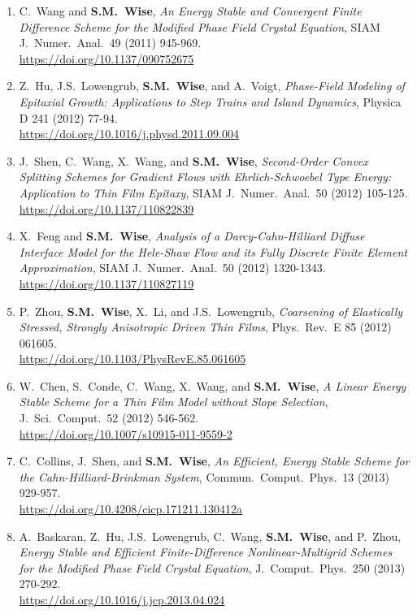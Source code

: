 \documentclass[11pt]{letter}
\begin{document}
\begin{enumerate}
	\item
C.~Wang and \textbf{S.M.~Wise}, {\sl An Energy Stable and Convergent Finite Difference Scheme for the Modified Phase Field Crystal Equation}, SIAM J.~Numer.~Anal.~49 (2011) 945-969.
	\\
\url{https://doi.org/10.1137/090752675}

	\item
Z.~Hu, J.S.~Lowengrub, \textbf{S.M.~Wise}, and A.~Voigt, {\sl Phase-Field Modeling of Epitaxial Growth: Applications to Step Trains and Island Dynamics}, Physica D 241 (2012) 77-94.
	\\
\url{https://doi.org/10.1016/j.physd.2011.09.004}

	\item
J.~Shen, C.~Wang, X.~Wang, and \textbf{S.M.~Wise}, {\sl Second-Order Convex Splitting Schemes for Gradient Flows with Ehrlich-Schwoebel Type Energy: Application to Thin Film Epitaxy}, SIAM J.~Numer.~Anal.~50 (2012) 105-125.
	\\
\url{https://doi.org/10.1137/110822839}
    
    \item
X.~Feng and \textbf{S.M.~Wise}, {\sl Analysis of a Darcy-Cahn-Hilliard Diffuse Interface Model for the Hele-Shaw Flow and its Fully Discrete Finite Element Approximation}, SIAM J.~Numer.~Anal.~50 (2012) 1320-1343.
	\\
\url{https://doi.org/10.1137/110827119}

    \item
P.~Zhou, \textbf{S.M.~Wise}, X.~Li, and J.S.~Lowengrub, {\sl Coarsening of Elastically Stressed, Strongly Anisotropic Driven Thin Films}, Phys.~Rev.~E 85 (2012) 061605.
	\\
\url{https://doi.org/10.1103/PhysRevE.85.061605}

	\item
W.~Chen, S.~Conde, C.~Wang, X.~Wang, and \textbf{S.M.~Wise}, {\sl A Linear Energy Stable Scheme for a Thin Film Model without Slope Selection}, J.~Sci.~Comput.~52 (2012) 546-562.
	\\
\url{https://doi.org/10.1007/s10915-011-9559-2}

    \item
C.~Collins, J.~Shen, and \textbf{S.M.~Wise}, {\sl An Efficient, Energy Stable Scheme for the Cahn-Hilliard-Brinkman System}, Commun.~Comput.~Phys.~13 (2013) 929-957.
	\\
\url{https://doi.org/10.4208/cicp.171211.130412a}

    \item
A.~Baskaran, Z.~Hu, J.S.~Lowengrub, C.~Wang, \textbf{S.M.~Wise}, and P.~Zhou, {\sl Energy Stable and Efficient Finite-Difference Nonlinear-Multigrid Schemes for the Modified Phase Field Crystal Equation}, J.~Comput.~Phys.~250 (2013) 270-292.
	\\
\url{https://doi.org/10.1016/j.jcp.2013.04.024}


\end{enumerate}
\end{document}
